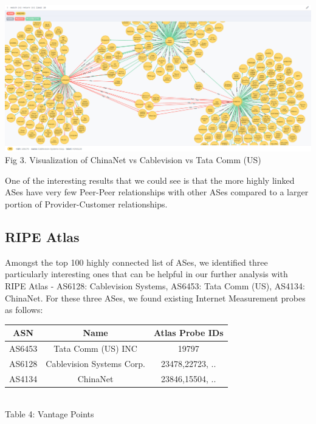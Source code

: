 \documentclass{sig-alternate-05-2015}
\begin{document}
\begin{center}
\includegraphics[scale=0.18]{graph3}\\
Fig 3. Visualization of ChinaNet vs Cablevision vs Tata Comm (US) \\
\end{center}
One of the interesting results that we could see is that the more highly linked ASes have 
very few Peer-Peer relationships with other ASes compared to a larger portion of Provider-Customer relationships.

\subsection{RIPE Atlas}
Amongst the top 100 highly connected list of ASes, we identified three particularly interesting ones that can be helpful in our further
analysis with RIPE Atlas -
AS6128: Cablevision Systems, AS6453: Tata Comm (US), AS4134: ChinaNet. For these three ASes, we found existing Internet Measurement
probes as follows:
\begin{center}
\begin{tabular}{ |c|c|c| } 
\hline
ASN &  Name & Atlas Probe IDs \\
 \hline
AS6453 &  Tata Comm (US) INC & 19797 \\
 \hline
AS6128 &  Cablevision Systems Corp. & 23478,22723, .. \\
 \hline
AS4134 &  ChinaNet & 23846,15504, .. \\
 \hline
 \end{tabular}
 \\Table 4: Vantage Points\\
\end{center}
\end{document}

